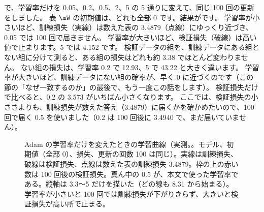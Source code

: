  で、学習率だけを 0.05、0.2、0.5、2、5 の 5 通りに変えて、同じ 100 回の更新をしました。
表 $\mW$ の初期値は、どれも全部 0 です。結果がです。
学習率が小さいほど、訓練損失（実線）は数えた表の 3.4879（点線）にゆっくり近づき、0.05 では 100 回で届きません。
学習率が大きいほど、検証損失（破線）は高い値で止まります。5 では 4.152 です。
検証データの組を、訓練データにある組とない組に分けて測ると、ある組の損失はどれも約 3.38 でほとんど変わりません。
ない組の損失は、学習率 0.2 で 12.93、5 で 43.22 と大きく違います。
学習率が大きいほど、訓練データにない組の確率が、早く 0 に近づくのです（この節の「なぜ一致するのか」の最後で、もう一度この話をします）。
検証損失だけで比べると、0.2 の 3.573 がいちばん小さくなります。
ここでは、検証損失の小ささよりも、訓練損失が数えた答え（3.4879）に届くかを確かめたいので、100 回で届く 0.5 を使いました（0.2 は 100 回後に 3.4940 で、まだ届いていません）。

\begin{figure}[tbp]
\centering
{}
\caption{Adam の学習率だけを変えたときの学習曲線（実測。\protect{}。モデル、初期値（全部 0）、損失、更新の回数 100 は同じ）。実線は訓練損失、破線は検証損失、点線は数えた表の訓練損失 3.4879。枠の上の赤い数は 100 回後の検証損失。真ん中の 0.5 が、本文で使った学習率である。縦軸は 3.3〜5 だけを描いた（どの線も 8.31 から始まる）。学習率が小さいと 100 回では訓練損失が下がりきらず、大きいと検証損失が高い所で止まる。}
\label{fig:lm-lr-sweep}
\end{figure}

